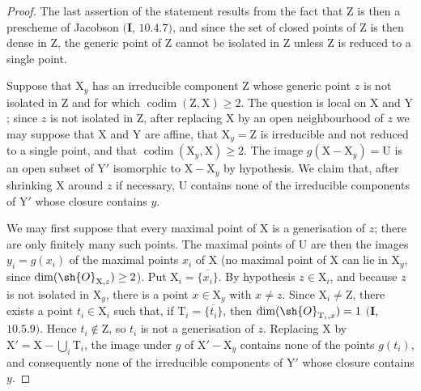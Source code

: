 \begin{proof}
The last assertion of the statement results from the fact that $\mathrm{Z}$ is then a prescheme of Jacobson $(\mathbf{I}$, $10.4.7)$, and since the set of closed points of $\mathrm{Z}$ is then dense in $\mathrm{Z}$, the generic point of $\mathrm{Z}$ cannot be isolated in $\mathrm{Z}$ unless $\mathrm{Z}$ is reduced to a single point.

Suppose that $\mathrm{X}_y$ has an irreducible component $\mathrm{Z}$ whose generic point $z$ is not isolated in $\mathrm{Z}$ and for which $\operatorname{codim}(\mathrm{Z},\mathrm{X})\geq 2$.
The question is local on $\mathrm{X}$ and $\mathrm{Y}$; since $z$ is not isolated in $\mathrm{Z}$, after replacing $\mathrm{X}$ by an open neighbourhood of $z$ we may suppose that $\mathrm{X}$ and $\mathrm{Y}$ are affine, that $\mathrm{X}_y=\mathrm{Z}$ is irreducible and not reduced to a single point, and that $\operatorname{codim}(\mathrm{X}_y,\mathrm{X})\geq 2$.
The image $g(\mathrm{X}-\mathrm{X}_y)=\mathrm{U}$ is an open subset of $\mathrm{Y}'$ isomorphic to $\mathrm{X}-\mathrm{X}_y$ by hypothesis.  We claim that, after shrinking $\mathrm{X}$ around $z$ if necessary, $\mathrm{U}$ contains none of the irreducible components of $\mathrm{Y}'$ whose closure contains $y$.

We may first suppose that every maximal point of $\mathrm{X}$ is a generisation of $z$; there are only finitely many such points.  The maximal points of $\mathrm{U}$ are then the images $y_i=g(x_i)$ of the maximal points $x_i$ of $\mathrm{X}$ (no maximal point of $\mathrm{X}$ can lie in $\mathrm{X}_y$, since $\dim(\sh{O}_{\mathrm{X},z})\geq 2$).  Put $\mathrm{X}_i=\overline{\{x_i\}}$.  By hypothesis $z\in\mathrm{X}_i$, and because $z$ is not isolated in $\mathrm{X}_y$, there is a point $x\in\mathrm{X}_y$ with $x\neq z$.  Since $\mathrm{X}_i\neq\mathrm{Z}$, there exists a point $t_i\in\mathrm{X}_i$ such that, if $\mathrm{T}_i=\overline{\{t_i\}}$, then $\dim(\sh{O}_{\mathrm{T}_i,x})=1$ $(\mathbf{I}$, $10.5.9)$.  Hence $t_i\notin\mathrm{Z}$, so $t_i$ is not a generisation of $z$.
Replacing $\mathrm{X}$ by $\mathrm{X}'=\mathrm{X}-\bigcup_i\mathrm{T}_i$, the image under $g$ of $\mathrm{X}'-\mathrm{X}_y$ contains none of the points $g(t_i)$, and consequently none of the irreducible components of $\mathrm{Y}'$ whose closure contains $y$.


\end{proof}
